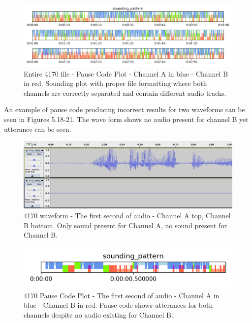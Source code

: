 \begin{figure}[h!]
	\centerline{\includegraphics[scale=0.5]{src/main-matter/methodology/preliminary-testing/4170/sounding_pattern_plot_4170_mono_split}}

	\caption{Entire 4170 file - Pause Code Plot - Channel A in blue - Channel B in red. Sounding plot with proper file formatting where both channels are correctly separated and contain different audio tracks.}
	\label{fig:separate-sounding}
\end{figure}

An example of pause code producing incorrect results for two waveforms can be seen in Figures 5.18-21. The wave form shows no audio present for channel B yet utterance can be seen. 

\begin{figure}[h!]
	\centerline{\includegraphics[scale=0.3]{src/main-matter/methodology/preliminary-testing/4170/waveform_4170_1s_chA_top_original}}
	\caption{4170 waveform - The first second of audio - Channel A top, Channel B bottom. Only sound present for Channel A, no sound present for Channel B.}
	\label{fig:upclose_sounding}
\end{figure}
\begin{figure}[h!]
	\centerline{\includegraphics[scale=0.9]{src/main-matter/methodology/preliminary-testing/4170/sounding_pattern_plot_4170_mono_1s_range_short}}
	\caption{4170 Pause Code Plot - The first second of audio - Channel A in blue - Channel B in red. Pause code shows utterances for both channels despite no audio existing for Channel B.}
	\label{fig:upclose_sounding}
\end{figure}


